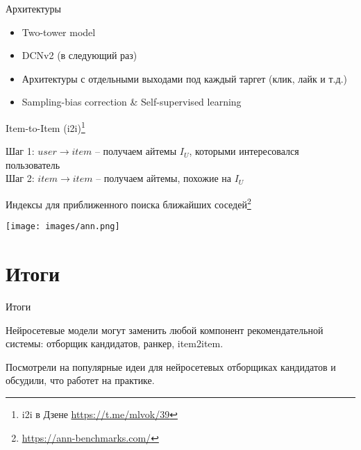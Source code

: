 \documentclass[11pt,aspectratio=169,handout]{beamer}
\begin{document}
\begin{frame}{Архитектуры \cite{METH}}

\begin{itemize}
\item Two-tower model
\item DCNv2 (в следующий раз)
\item Архитектуры с отдельными выходами под каждый таргет (клик, лайк и т.д.)
\item Sampling-bias correction \& Self-supervised learning
\end{itemize}

\end{frame}

\begin{frame}{Item-to-Item (i2i)\footnote{i2i в Дзене \url{https://t.me/mlvok/39}}}

Шаг 1: $user \rightarrow item$ -- получаем айтемы $I_U$, которыми интересовался пользователь \\
Шаг 2: $item \rightarrow item$ -- получаем айтемы, похожие на $I_U$

\vfill

Индексы для приближенного поиска ближайших соседей\footnote{\url{https://ann-benchmarks.com/}}
\begin{center}
\texttt{[image: images/ann.png]}
\end{center}

\end{frame}

\section{Итоги}

\begin{frame}{Итоги}

\begin{tcolorbox}[colback=info!5,colframe=info!80,title=]
Нейросетевые модели могут заменить любой компонент рекомендательной системы: отборщик кандидатов, ранкер, item2item.
\end{tcolorbox}

\vfill

\begin{tcolorbox}[colback=info!5,colframe=info!80,title=]
Посмотрели на популярные идеи для нейросетевых отборщиках кандидатов и обсудили, что работет на практике.
\end{tcolorbox}

\end{frame}
\end{document}
